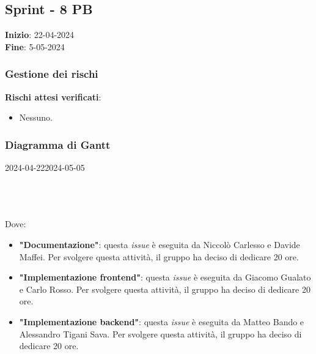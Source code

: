 \subsection{Sprint - 8 PB}
\textbf{Inizio}: 22-04-2024 \\
\textbf{Fine}: 5-05-2024

\subsubsection{Gestione dei rischi}
\textbf{Rischi attesi verificati}:

\begin{itemize}
	\item Nessuno.
\end{itemize}

\subsubsection{Diagramma di Gantt}

\begin{ganttchart}[
		x unit=0.6cm, %
		y unit chart=0.6cm,
		bar/.style={fill=blue!50},
		bar height=0.5,
		time slot format=isodate,
		time slot unit=day,
		vgrid,
		today=2024-04-22,
		today rule/.style={draw=red, ultra thick}
	]{2024-04-22}{2024-05-05}
	 \\
	 \\
	 \\
	 \\
\end{ganttchart}

Dove:
\begin{itemize}
	\item \textbf{"Documentazione"}: questa \textit{issue} è eseguita da Niccolò Carlesso e Davide Maffei. Per svolgere questa attività, il gruppo ha deciso di dedicare 20 ore.
	\item \textbf{"Implementazione frontend"}: questa \textit{issue} è eseguita da Giacomo Gualato e Carlo Rosso. Per svolgere questa attività, il gruppo ha deciso di dedicare 20 ore.
	\item \textbf{"Implementazione backend"}: questa \textit{issue} è eseguita da Matteo Bando e Alessandro Tigani Sava. Per svolgere questa attività, il gruppo ha deciso di dedicare 20 ore.
\end{itemize}

